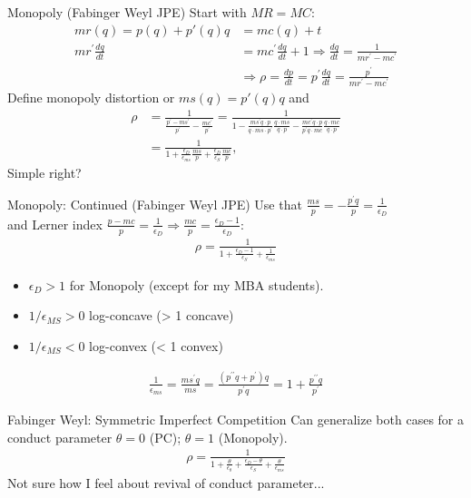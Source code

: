 \begin{frame}{Monopoly (Fabinger Weyl JPE)}
Start with $MR = MC$:
\begin{align*}
mr(q) = p(q) + p'(q) q &= mc(q) + t\\
m r^{\prime} \frac{d q}{d t} & =m c^{\prime} \frac{d q}{d t}+1 \Rightarrow \frac{d q}{d t}=\frac{1}{m r^{\prime}-m c^{\prime}} \\
& \Rightarrow \rho=\frac{d p}{d t}=p^{\prime} \frac{d q}{d t}=\frac{p^{\prime}}{m r^{\prime}-m c^{\prime}}
\end{align*}
Define monopoly distortion or $ms(q) = p'(q) q$ and
\begin{align*}
\rho & =\frac{1}{\frac{p^{\prime}-m s^{\prime}}{p^{\prime}}-\frac{m c^{\prime}}{p^{\prime}}}=\frac{1}{1-\frac{m s^{\prime} q \cdot p}{q \cdot m s \cdot p^{\prime}} \frac{q \cdot m s}{q \cdot p}-\frac{m c^{\prime} q \cdot p}{p^{\prime} q \cdot m c} \frac{q \cdot m c}{q \cdot p}} \\
& =\frac{1}{1+\frac{\epsilon_D}{\epsilon_{m s}} \frac{m s}{p}+\frac{\epsilon_D}{\epsilon_S} \frac{m c}{p}},
\end{align*}
Simple right?
\end{frame}


\begin{frame}{Monopoly: Continued (Fabinger Weyl JPE)}
Use that $\frac{m s}{p}=-\frac{p^{\prime} q}{p}=\frac{1}{\epsilon_D}$\\
 and Lerner index $\frac{p-m c}{p}=\frac{1}{\epsilon_D} \Rightarrow \frac{m c}{p}=\frac{\epsilon_D-1}{\epsilon_D}$:
\begin{align*}
\rho=\frac{1}{1+\frac{\epsilon_D-1}{\epsilon_S}+\frac{1}{\epsilon_{m s}}}
\end{align*}
\begin{itemize}
\item $\epsilon_D >1$ for Monopoly (except for my MBA students).
\item $1/\epsilon_{MS} >0$ log-concave (> 1 concave)
\item $1/\epsilon_{MS} <0$ log-convex  (< 1 convex)
\end{itemize}
\begin{align*}
\frac{1}{\epsilon_{m s}}=\frac{m s^{\prime} q}{m s}=\frac{\left(p^{\prime \prime} q+p^{\prime}\right) q}{p^{\prime} q}=1+\frac{p^{\prime \prime} q}{p^{\prime}}
\end{align*}
\end{frame}

\begin{frame}{Fabinger Weyl: Symmetric Imperfect Competition}
Can generalize both cases for a conduct parameter $\theta=0$ (PC); $\theta=1$ (Monopoly).
\begin{align*}
\rho=\frac{1}{1+\frac{\theta}{\epsilon_\theta}+\frac{\epsilon_D-\theta}{\epsilon_S}+\frac{\theta}{\epsilon_{m s}}}
\end{align*}
Not sure how I feel about revival of conduct parameter...
\end{frame}



